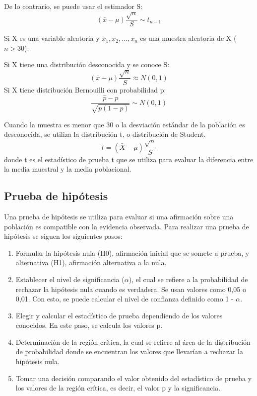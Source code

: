 \documentclass[a4paper, 12pt]{book}
\begin{document}
De lo contrario, se puede usar el estimador S:
\begin{equation}
	(\bar{x}-\mu) \frac{\sqrt{n}}{S} \sim t_{n-1}
\end{equation}


Si X es una variable aleatoria y ${x_1, x_2, \hdots, x_n}$ es una muestra aleatoria de X ($n>30$):

Si X tiene una distribución desconocida y se conoce S:
\begin{equation}
	(\bar{x}-\mu) \frac{\sqrt{n}}{S} \approx N(0,1)
\end{equation}
Si X tiene distribución Bernouilli con probabilidad p:
\begin{equation}
	\frac{\hat{p} -p}{\sqrt{p(1-p)}} \sim N(0,1)
\end{equation}

Cuando la muestra es menor que 30 o la desviación estándar de la población es desconocida, se utiliza la distribución t, o distribución de Student.
\begin{equation}
	t = (\bar{X} - \mu )\frac{\sqrt{n}}{S}
\end{equation}
donde t es el estadístico de prueba t que se utiliza para evaluar la diferencia entre la media muestral y la media poblacional.

\subsection{Prueba de hipótesis}
Una prueba de hipótesis se utiliza para evaluar si una afirmación sobre una población es compatible con la evidencia observada. Para realizar una prueba de hipótesis se siguen los siguientes pasos:
\begin{enumerate}
	\item Formular la hipótesis nula (H0), afirmación inicial que se somete a prueba, y alternativa (H1), afirmación alternativa a la nula.
	\item Establecer el nivel de significancia ($\alpha$), el cual se refiere a la probabilidad de rechazar la hipótesis nula cuando es verdadera. Se usan valores como 0,05 o 0,01. Con esto, se puede calcular el nivel de confianza definido como 1 - $\alpha$.
	\item Elegir y calcular el estadístico de prueba dependiendo de los valores conocidos. En este paso, se calcula los valores p.
	\item Determinación de la región crítica, la cual se refiere al área de la distribución de probabilidad donde se encuentran los valores que llevarían a rechazar la hipótesis nula.
	\item Tomar una decisión comparando el valor obtenido del estadístico de prueba y los valores de la región crítica, es decir, el valor p y la significancia.
\end{enumerate}
\end{document}
